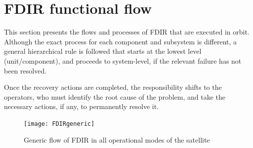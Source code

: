 \documentclass[a4paper,nobib,final]{tufte-book}
\begin{document}
\clearpage
\section{\acs{FDIR} functional flow}
\label{sec:fdir_operating_modes}

This section presents the flows and processes of \acs{FDIR} that are executed in orbit. Although the exact process for each component and subsystem is different, a general hierarchical rule is followed that starts at the lowest level (unit/component), and proceeds to system-level, if the relevant failure has not been resolved.

Once the recovery actions are completed, the responsibility shifts to the operators, who must identify the root cause of the problem, and take the necessary actions, if any, to permanently resolve it.

\begin{figure}[h]
	\texttt{[image: FDIRgeneric]}
	\caption{Generic flow of \acs{FDIR} in all operational modes of the satellite}
	\label{fig:generalflow}
\end{figure}
\end{document}
